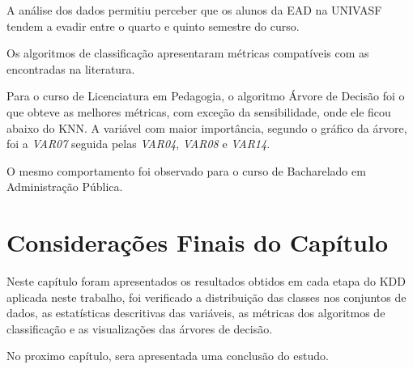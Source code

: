 A análise dos dados permitiu perceber que os alunos da EAD na UNIVASF tendem a evadir entre o quarto e quinto semestre do curso.

Os algoritmos de classificação apresentaram métricas compatíveis com as encontradas na literatura.

Para o curso de Licenciatura em Pedagogia, o algoritmo Árvore de Decisão foi o
que obteve as melhores métricas, com exceção da sensibilidade, onde ele ficou
abaixo do KNN. A variável com maior importância, segundo o gráfico da árvore,
foi a \textit{VAR07} seguida pelas \textit{VAR04}, \textit{VAR08} e
\textit{VAR14}.

O mesmo comportamento foi observado para o curso de Bacharelado em Administração
Pública.

\section{Considerações Finais do Capítulo}

Neste capítulo foram apresentados os resultados obtidos em cada etapa do KDD
aplicada neste trabalho, foi verificado a distribuição das classes nos conjuntos
de dados, as estatísticas descritivas das variáveis, as métricas dos algoritmos
de classificação e as visualizações das árvores de decisão.

No proximo capítulo, sera apresentada uma conclusão do estudo.
